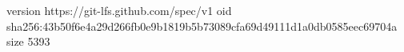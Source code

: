 version https://git-lfs.github.com/spec/v1
oid sha256:43b50f6e4a29d266fb0e9b1819b5b73089cfa69d49111d1a0db0585eec69704a
size 5393
